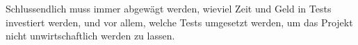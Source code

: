 \documentclass[a4paper,bibtotoc,oneside]{scrbook}
\begin{document}
Schlussendlich muss immer abgewägt werden, wieviel Zeit und Geld in Tests investiert werden, und vor allem, welche Tests umgesetzt werden, um das Projekt nicht unwirtschaftlich werden zu lassen.






\end{document}
